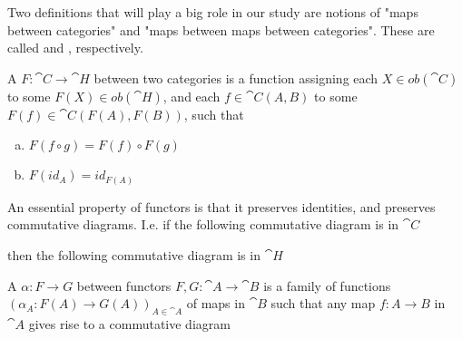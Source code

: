 Two definitions that will play a big role in our study are notions of "maps between categories" and "maps between maps between categories". These are called  and , respectively.

\begin{definition}
A  $F:\cat{C}\rightarrow\cat{H}$ between two categories is a function assigning each $X\in ob(\cat{C})$ to some $F(X)\in ob(\cat{H})$, and each $f\in \cat{C}(A,B)$ to some $F(f)\in \cat{C}(F(A),F(B))$, such that
\begin{enumerate}[(a)]
\item $F(f\circ g)=F(f)\circ F(g)$
\item $F(id_A)=id_{F(A)}$
\end{enumerate}
\end{definition}

An essential property of functors is that it preserves identities, and preserves commutative diagrams. I.e. if the following commutative diagram is in $\cat{C}$
then the following commutative diagram is in $\cat{H}$

\begin{definition}
A  $\alpha:F\rightarrow G$ between functors $F,G:\cat{A}\rightarrow \cat{B}$ is a family of functions $(\alpha_A:F(A)\rightarrow G(A))_{A\in \cat{A}}$ of maps in $\cat{B}$ such that any map $f:A\rightarrow B$ in $\cat{A}$ gives rise to a commutative diagram

\end{definition}

